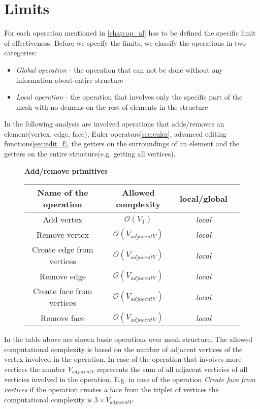 \section{Limits}

For each operation mentioned in \ref{chap:op_al} has to be defined the specific limit
of effectiveness. Before we specify the limits, we classify the operations in two categories:

\begin{itemize}
\item \emph{Global operation} - the operation that can not be done without any information
about entire structure
\item \emph{Local operation} - the operation that involves only the specific part of the mesh
with no demans on the rest of elements in the structure
\end{itemize}
In the following analysis are involved operations that adds/removes an element(vertex, edge, face),
Euler operators\ref{sec:euler}, advanced editing functions\ref{sec:edit_f},
the getters on the surroundings of an element and the getters
on the entire structure(e.g. getting all vertices).

\begin{figure}[!hbf]

\centering
\textbf{Add/remove primitives}\\
\label{fig:comp_prim}
\vspace{2mm}
\begin{tabular}{| c | c | c | c |}
\hline
\textbf{Name of the operation} & \textbf{Allowed complexity} & \textbf{local/global}\\
\hline
Add vertex & $\mathcal{O}(V_{1})$ & \emph{local}\\
\hline
Remove vertex & $\mathcal{O}(V_{adjacentV})$ & \emph{local}\\
\hline
Create edge from vertices& $\mathcal{O}(V_{adjacentV})$ & \emph{local}\\
\hline
Remove edge & $\mathcal{O}(V_{adjacentV})$ & \emph{local}\\
\hline
Create face from vertices& $\mathcal{O}(V_{adjacentV})$ & \emph{local}\\
\hline
Remove face & $\mathcal{O}(V_{adjacentV})$ & \emph{local}\\
\hline
\end{tabular}
\end{figure}
In the table above are shown basic operations over mesh structure. The allowed
computational complexity is based on the number of adjacent vertices of the vertex involved
in the operation. In case of the operation that involves more vertices the number $V_{adjacentV}$
represents the sum of all adjacent verticies of all verticies involved in the operation.
E.g. in case of the operation \emph{Create face from vertices} if the operation creates a
face from the triplet of vertices the computational complexity is $3 \times V_{adjacentV}$.

